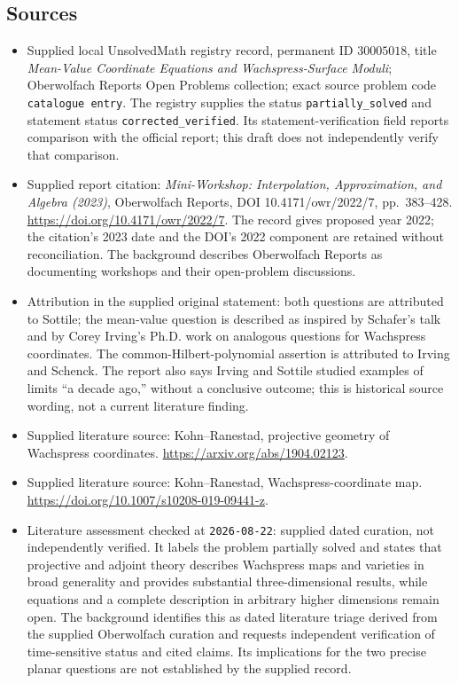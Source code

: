 \documentclass[11pt]{article}
\begin{document}
\subsection{Sources}
\begin{itemize}
\item Supplied local UnsolvedMath registry record, permanent ID \(30005018\), title \emph{Mean-Value Coordinate Equations and Wachspress-Surface Moduli}; Oberwolfach Reports Open Problems collection; exact source problem code \texttt{catalogue entry}. The registry supplies the status \texttt{partially\_solved} and statement status \texttt{corrected\_verified}. Its statement-verification field reports comparison with the official report; this draft does not independently verify that comparison.
\item Supplied report citation: \emph{Mini-Workshop: Interpolation, Approximation, and Algebra (2023)}, Oberwolfach Reports, DOI 10.4171/owr/2022/7, pp.\ 383--428. \url{https://doi.org/10.4171/owr/2022/7}. The record gives proposed year 2022; the citation's 2023 date and the DOI's 2022 component are retained without reconciliation. The background describes Oberwolfach Reports as documenting workshops and their open-problem discussions.
\item Attribution in the supplied original statement: both questions are attributed to Sottile; the mean-value question is described as inspired by Schafer's talk and by Corey Irving's Ph.D. work on analogous questions for Wachspress coordinates. The common-Hilbert-polynomial assertion is attributed to Irving and Schenck. The report also says Irving and Sottile studied examples of limits ``a decade ago,'' without a conclusive outcome; this is historical source wording, not a current literature finding.
\item Supplied literature source: Kohn--Ranestad, projective geometry of Wachspress coordinates. \url{https://arxiv.org/abs/1904.02123}.
\item Supplied literature source: Kohn--Ranestad, Wachspress-coordinate map. \url{https://doi.org/10.1007/s10208-019-09441-z}.
\item Literature assessment checked at \texttt{2026-08-22}: supplied dated curation, not independently verified. It labels the problem partially solved and states that projective and adjoint theory describes Wachspress maps and varieties in broad generality and provides substantial three-dimensional results, while equations and a complete description in arbitrary higher dimensions remain open. The background identifies this as dated literature triage derived from the supplied Oberwolfach curation and requests independent verification of time-sensitive status and cited claims. Its implications for the two precise planar questions are not established by the supplied record.
\end{itemize}
\end{document}
